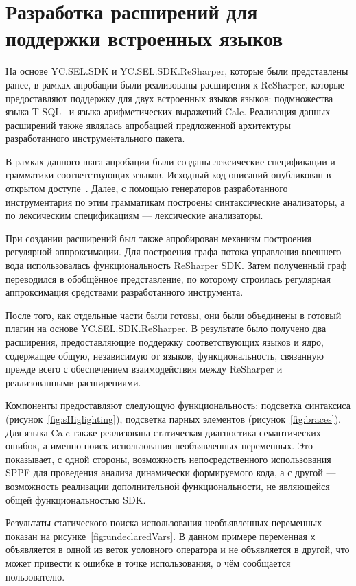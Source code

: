 \section{Разработка расширений для поддержки встроенных языков}

На основе YC.SEL.SDK и YC.SEL.SDK.ReSharper, которые были представлены ранее, в рамках апробации были реализованы расширения к ReSharper, которые предоставляют поддержку для  двух встроенных языков языков: подмножества языка T-SQL~\cite{TSQL} и языка арифметических выражений Calc. Реализация данных расширений также являлась апробацией предложенной архитектуры разработанного инструментального пакета.

В рамках данного шага апробации были созданы лексические спецификации и грамматики соответствующих языков. Исходный код описаний опубликован в открытом доступе~\cite{YCZOO}. Далее, с помощью генераторов разработанного инструментария по этим грамматикам построены синтаксические анализаторы, а по лексическим спецификациям --- лексические анализаторы.

При создании расширений был также апробирован механизм построения регулярной аппроксимации. Для построения графа потока управления внешнего вода использовалась функциональность ReSharper SDK. Затем полученный граф переводился в обобщённое представление, по которому строилась регулярная аппроксимация средствами разработанного инструмента.

После того, как отдельные части были готовы, они были объединены в готовый плагин на основе YC.SEL.SDK.ReSharper. В результате было получено два расширения, предоставляющие поддержку соответствующих языков и ядро, содержащее общую, независимую от языков, функциональность, связанную прежде всего с обеспечением взаимодействия между ReSharper и реализованными расширениями.

Компоненты предоставляют следующую функциональность: подсветка синтаксиса (рисунок~\ref{fig:sHiglighting}), подсветка парных элементов (рисунок~\ref{fig:braces}). Для языка Calc также реализована статическая диагностика семантических ошибок, а именно поиск использования необъявленных переменных. Это показывает, с одной стороны, возможность непосредственного использования SPPF для проведения анализа динамически формируемого кода, а с другой --- возможность реализации дополнительной функциональности, не являющейся общей функциональностью SDK.

Результаты статического поиска использования необъявленных переменных показан на 
рисунке~\ref{fig:undeclaredVars}. В данном примере переменная \verb|x| объявляется в одной из веток условного оператора и не объявляется в другой, что может привести к ошибке в точке использования, о чём сообщается пользователю.

